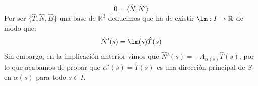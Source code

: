 \documentclass[12pt]{article}
\begin{document}
\begin{ejercicio}
\begin{enumerate}[label=\alph*)]
\begin{description}
\begin{equation*}
                            0 = \langle \hat{N},\hat{N}' \rangle 
                        \end{equation*}
                        Por ser $\{\hat{T},\hat{N},\hat{B}\}$ una base de $\mathbb{R}^3$ deducimos que ha de existir $\lm:I\to\mathbb{R}$ de modo que:
                        \begin{equation*}
                            \hat{N}'(s) = \lm(s)\hat{T}(s)
                        \end{equation*}
                        Sin embargo, en la implicación anterior vimos que $\hat{N}'(s) = -A_{\alpha(s)}\hat{T}(s)$, por lo que acabamos de probar que $\alpha'(s) = \hat{T}(s)$ es una dirección principal de $S$ en $\alpha(s)$ para todo $s\in I$.
                \end{description}
        \end{enumerate}
    \end{ejercicio}
\end{document}
